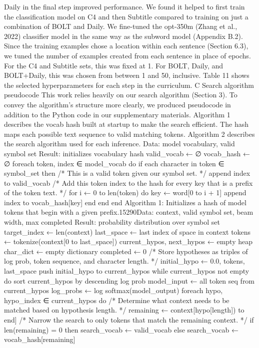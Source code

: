 Daily in the final step improved performance. We
found it helped to first train the classification model
on C4 and then Subtitle compared to training on
just a combination of BOLT and Daily.
We fine-tuned the opt-350m (Zhang et al., 2022)
classifier model in the same way as the subword
model (Appendix B.2). Since the training examples
chose a location within each sentence (Section 6.3),
we tuned the number of examples created from
each sentence in place of epochs. For the C4 and
Subtitle sets, this was fixed at 1. For BOLT, Daily,
and BOLT+Daily, this was chosen from between
1 and 50, inclusive. Table 11 shows the selected
hyperparameters for each step in the curriculum.
C Search algorithm pseudocode
This work relies heavily on our search algorithm
(Section 3). To convey the algorithm’s structure
more clearly, we produced pseudocode in addition
to the Python code in our supplementary materials. Algorithm 1 describes the vocab hash built
at startup to make the search efficient. The hash
maps each possible text sequence to valid matching
tokens. Algorithm 2 describes the search algorithm
used for each inference.
Data: model vocabulary, valid symbol set
Result: initializes vocabulary hash
valid_vocab ← ∅
vocab_hash ← ∅
foreach token, index ∈ model_vocab do
if each character in token ∈ symbol_set then
/* This is a valid token given our
symbol set. */
append index to valid_vocab
/* Add this token index to the hash
for every key that is a prefix
of the token text. */
for i ← 0 to len(token) do
key ← word[0 to i + 1]
append index to vocab_hash[key]
end
end
end
Algorithm 1: Initializes a hash of model tokens that begin with a given prefix.15290Data: context, valid symbol set, beam width, max completed
Result: probability distribution over symbol set
target_index ← len(context)
last_space ← last index of space in context
tokens ← tokenize(context[0 to last_space])
current_hypos, next_hypos ← empty heap
char_dict ← empty dictionary
completed ← 0
/* Store hypotheses as triples of log prob, token sequence, and character length. */
initial_hypo ← 0.0, tokens, last_space
push initial_hypo to current_hypos
while current_hypos not empty do
sort current_hypos by descending log prob
model_input ← all token seq from current_hypos
log_probs ← log softmax(model_output)
foreach hypo, hypo_index ∈ current_hypos do
/* Determine what context needs to be matched based on hypothesis length. */
remaining ← context[hypo[length]) to end]
/* Narrow the search to only tokens that match the remaining context. */
if len(remaining) = 0 then
search_vocab ← valid_vocab
else
search_vocab ← vocab_hash[remaining]
